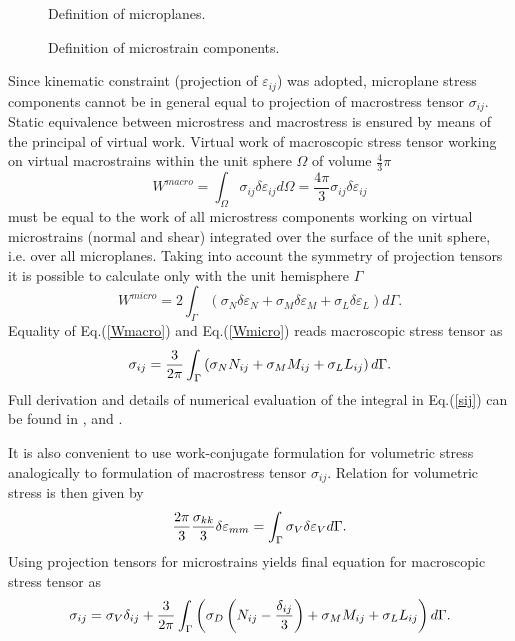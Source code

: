 \begin{figure}[h]
\centering
{}
\caption{Definition of microplanes.}
\label{fig:sphere1}
\end{figure}
\begin{figure}[h]
\centering
{}
\caption{Definition of microstrain components.}
\label{fig:sphere2}
\end{figure}

Since kinematic constraint (projection of $\varepsilon_{ij}$) was adopted, microplane stress components cannot
be in general equal to projection of macrostress tensor $\sigma_{ij}$. Static equivalence between microstress
and macrostress is ensured by means of the principal of virtual work.
Virtual work of macroscopic stress tensor working on virtual macrostrains within the unit sphere $\Omega$ of volume $\frac{4}{3}\pi$
\begin{equation}
\label{Wmacro}
W^{macro} = \int_\Omega \sigma_{ij} \delta\varepsilon_{ij}d\Omega=\frac{4\pi}{3}\sigma_{ij}\delta\varepsilon_{ij}
\end{equation}
must be equal to the work of all microstress components working on virtual microstrains (normal and shear) integrated over the surface of the
unit sphere, i.e. over all microplanes. Taking into account the symmetry of projection tensors 
it is possible to calculate only with the unit hemisphere $\Gamma$
\begin{equation}
\label{Wmicro}
W^{micro} = 2 \int_\Gamma \left(\sigma_{N} \delta\varepsilon_{N}+ \sigma_M\delta\varepsilon_M + \sigma_L\delta\varepsilon_L\right) d\Gamma.
\end{equation}
Equality of Eq.(\ref{Wmacro}) and Eq.(\ref{Wmicro}) reads macroscopic stress tensor as
\begin{equation}
\label{sij}
\sigma_{ij} = {{3}\over{2\pi}} \int_\Gamma \left(\sigma_N N_{ij} + \sigma_M M_{ij} + \sigma_L L_{ij}\right)d\Gamma.
\end{equation}
Full derivation and details of numerical evaluation of the integral in Eq.(\ref{sij}) 
can be found in \cite{bazant1}, \cite{bazant2} and \cite{bazant3}. 

It is also convenient to use work-conjugate formulation for volumetric stress analogically to formulation of macrostress tensor $\sigma_{ij}$.
Relation for volumetric stress is then given by
\begin{equation}
\label{volstress}
{{2\pi}\over{3}}{{\sigma_{kk}}\over{3}}\delta\varepsilon_{mm} = \int_\Gamma \sigma_V \delta\varepsilon_Vd\Gamma.
\end{equation}
Using projection tensors for microstrains yields final equation for macroscopic stress tensor as
\begin{equation}
\label{sid}
\sigma_{ij} = \sigma_V\delta_{ij} + {{3}\over{2\pi}}\int_\Gamma \left(\sigma_D \left(N_{ij} -
{{\delta_{ij}}\over{3}}\right) + \sigma_M M_{ij} + \sigma_L L_{ij}\right) d\Gamma.
\end{equation}


